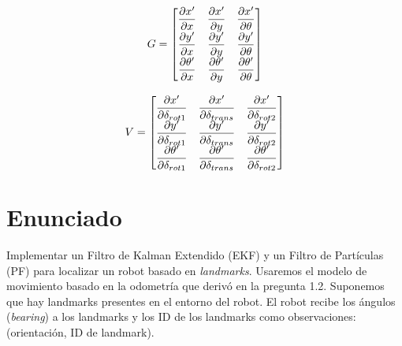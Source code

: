 \documentclass[tp]{lcc}
\begin{document}
    \noindent
    \begin{minipage}[t]{.5\textwidth}
    \begin{equation*}
        G =
        \begin{bmatrix}
            \dfrac{\partial x^{\prime}}{\partial x} & \dfrac{\partial x^{\prime}}{\partial y} & \dfrac{\partial x^{\prime}}{\partial \theta}\\
            \dfrac{\partial y^{\prime}}{\partial x} & \dfrac{\partial y^{\prime}}{\partial y} & \dfrac{\partial y^{\prime}}{\partial \theta}\\
            \dfrac{\partial \theta^{\prime}}{\partial x} & \dfrac{\partial \theta^{\prime}}{\partial y} & \dfrac{\partial \theta^{\prime}}{\partial \theta}
        \end{bmatrix}
\end{equation*}
    \end{minipage}%
    \begin{minipage}[t]{.5\textwidth}
        \begin{equation*}
            V =
            \begin{bmatrix}
                \dfrac{\partial x^{\prime}}{\partial \delta_{rot1}} & \dfrac{\partial x^{\prime}}{\partial \delta_{trans}} & \dfrac{\partial x^{\prime}}{\partial \delta_{rot2}}\\
                \dfrac{\partial y^{\prime}}{\partial \delta_{rot1}} & \dfrac{\partial y^{\prime}}{\partial \delta_{trans}} & \dfrac{\partial y^{\prime}}{\partial \delta_{rot2}}\\
                \dfrac{\partial \theta^{\prime}}{\partial \delta_{rot1}} & \dfrac{\partial \theta^{\prime}}{\partial \delta_{trans}} & \dfrac{\partial \theta^{\prime}}{\partial \delta_{rot2}}
            \end{bmatrix}
        \end{equation*}
    \end{minipage}
    
	
	\section{Enunciado}
		
	Implementar un Filtro de Kalman Extendido (EKF) y un Filtro de Partículas (PF) para localizar un robot basado en \emph{landmarks}. Usaremos el modelo de movimiento basado en la odometría que derivó en la pregunta 1.2. Suponemos que hay landmarks presentes en el entorno del robot. El robot recibe los ángulos (\emph{bearing}) a los landmarks y los ID de los landmarks como observaciones: (orientación, ID de landmark).
	
\end{document}
